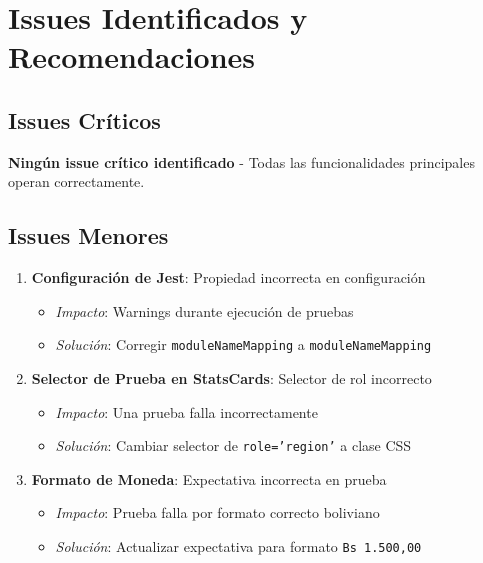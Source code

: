 \documentclass[12pt,a4paper]{article}
\begin{document}
\section{Issues Identificados y Recomendaciones}

\subsection{Issues Críticos}

\textcolor{dangerred}{\textbf{Ningún issue crítico identificado}} - Todas las funcionalidades principales operan correctamente.

\subsection{Issues Menores}

\begin{enumerate}
    \item \textbf{Configuración de Jest}: Propiedad incorrecta en configuración
    \begin{itemize}
        \item \textit{Impacto}: Warnings durante ejecución de pruebas
        \item \textit{Solución}: Corregir \texttt{moduleNameMapping} a \texttt{moduleNameMapping}
    \end{itemize}
    
    \item \textbf{Selector de Prueba en StatsCards}: Selector de rol incorrecto
    \begin{itemize}
        \item \textit{Impacto}: Una prueba falla incorrectamente
        \item \textit{Solución}: Cambiar selector de \texttt{role='region'} a clase CSS
    \end{itemize}
    
    \item \textbf{Formato de Moneda}: Expectativa incorrecta en prueba
    \begin{itemize}
        \item \textit{Impacto}: Prueba falla por formato correcto boliviano
        \item \textit{Solución}: Actualizar expectativa para formato \texttt{Bs 1.500,00}
    \end{itemize}
\end{enumerate}
\end{document}
